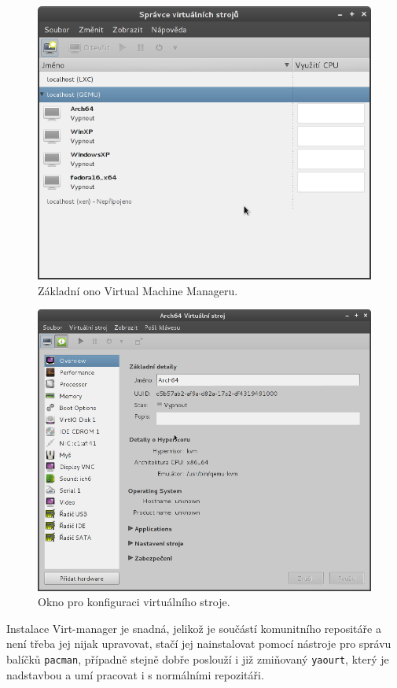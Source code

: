 \begin{figure}[h!]
  \centering
  \includegraphics[width=12cm]{obr/vmm}
  \caption{Základní ono Virtual Machine Manageru.}
  \label{obr:vmm}
\end{figure}
\begin{figure}[h!]
  \centering
  \includegraphics[width=12cm]{obr/vmmc}
  \caption{Okno pro konfiguraci virtuálního stroje.}
  \label{obr:vmmc}
\end{figure}
\newpage
Instalace Virt-manager je snadná, jelikož je součástí komunitního repositáře a není třeba jej nijak upravovat, stačí jej nainstalovat pomocí nástroje pro správu balíčků \texttt{pacman}, případně stejně dobře poslouží i již zmiňovaný \texttt{yaourt}, který je nadstavbou a umí pracovat i s normálními repozitáři.
